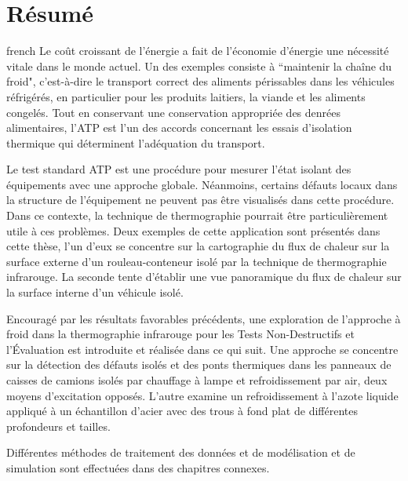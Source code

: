 \chapter*{Résumé}                      %

\begin{otherlanguage*}{french}
  Le coût croissant de l'énergie a fait de l'économie d'énergie une nécessité vitale dans le monde actuel. Un des exemples consiste à ``maintenir la chaîne du froid", c'est-à-dire le transport correct des aliments périssables dans les véhicules réfrigérés, en particulier pour les produits laitiers, la viande et les aliments congelés. Tout en conservant une conservation appropriée des denrées alimentaires, l'ATP est l'un des accords concernant les essais d'isolation thermique qui déterminent l'adéquation du transport.
  
  Le test standard ATP est une procédure pour mesurer l'état isolant des équipements avec une approche globale. Néanmoins, certains défauts locaux dans la structure de l'équipement ne peuvent pas être visualisés dans cette procédure. Dans ce contexte, la technique de thermographie pourrait être particulièrement utile à ces problèmes. Deux exemples de cette application sont présentés dans cette thèse, l'un d'eux se concentre sur la cartographie du flux de chaleur sur la surface externe d'un rouleau-conteneur isolé par la technique de thermographie infrarouge. La seconde tente d'établir une vue panoramique du flux de chaleur sur la surface interne d'un véhicule isolé.
  
  Encouragé par les résultats favorables précédents, une exploration de l'approche à froid dans la thermographie infrarouge pour les Tests Non-Destructifs et l'Évaluation est introduite et réalisée dans ce qui suit. Une approche se concentre sur la détection des défauts isolés et des ponts thermiques dans les panneaux de caisses de camions isolés par chauffage à lampe et refroidissement par air, deux moyens d'excitation opposés. L'autre examine un refroidissement à l'azote liquide appliqué à un échantillon d'acier avec des trous à fond plat de différentes profondeurs et tailles.
  
  Différentes méthodes de traitement des données et de modélisation et de simulation sont effectuées dans des chapitres connexes.
\end{otherlanguage*}
